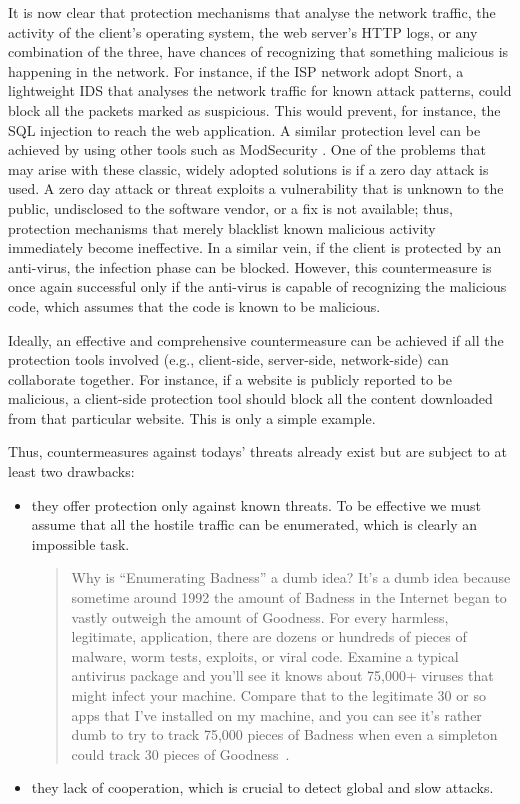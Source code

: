 \documentclass[12pt]{article}
\theoremstyle{definition}
\begin{document}
		It is now clear that protection mechanisms that analyse the network
		traffic, the activity of the client's operating system, the web
		server's HTTP logs, or any combination of the three, have chances
		of recognizing that something malicious is happening in the
		network\cite{Gupta2016}. For instance, if the ISP network adopt \textsf{Snort}, a
		lightweight IDS that analyses the network traffic for known
		attack patterns, could block all the packets marked as
		suspicious. This would prevent, for instance, the SQL injection
		to reach the web application. A similar protection level can be
		achieved by using other tools such as \textsf{ModSecurity}
		. One of the problems that may arise with
		these classic, widely adopted solutions is if a zero day
		attack is used. A zero day attack or threat exploits a vulnerability
		that is unknown to the public, undisclosed to the software vendor, or
		a fix is not available; thus, protection mechanisms that merely
		blacklist known malicious activity immediately become ineffective. In
		a similar vein, if the client is protected by an anti-virus, the
		infection phase can be blocked. However, this countermeasure is once
		again successful only if the anti-virus is capable of recognizing the
		malicious code, which assumes that the code is known to be malicious.
		
		Ideally, an effective and comprehensive countermeasure can be achieved
		if all the protection tools involved (e.g., client-side,
		server-side, network-side) can collaborate together\cite{Bosman2017}. For
		instance, if a website is publicly reported to be malicious, a
		client-side protection tool should block all the content
		downloaded from that particular website. This is only a simple
		example.
		
		Thus, countermeasures against todays' threats already exist but are
		subject to at least two drawbacks:
		
		\begin{itemize}
			\item they offer protection only against known threats. To be
			effective we must assume that all the hostile traffic can be
			enumerated, which is clearly an impossible task.
			
			\begin{quotation}
				Why is ``Enumerating Badness'' a dumb idea? It's a dumb idea
				because sometime around 1992 the amount of Badness in the Internet
				began to vastly outweigh the amount of Goodness. For every
				harmless, legitimate, application, there are dozens or hundreds of
				pieces of malware, worm tests, exploits, or viral code. Examine a
				typical antivirus package and you'll see it knows about 75,000+
				viruses that might infect your machine. Compare that to the
				legitimate 30 or so apps that I've installed on my machine, and
				you can see it's rather dumb to try to track 75,000 pieces of
				Badness when even a simpleton could track 30 pieces of
				Goodness~\citep{ranum-myths}.
			\end{quotation}
			
			\item they lack of cooperation, which is crucial to detect global and
			slow attacks.
		\end{itemize}
		
\end{document}
